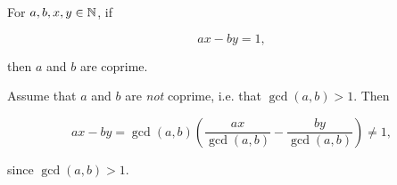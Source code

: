 \begin{vworklemmastatement}
\label{lem:cpri0:ppn0:000p}
For $a, b, x, y \in {\mathbb{N}}$, if

\begin{equation}
 ax - by = 1 ,
\end{equation}

then $a$ and $b$ are coprime.
\end{vworklemmastatement}
\begin{vworklemmaproof}
Assume that $a$ and $b$ are \emph{not} coprime,
i.e. that $\gcd(a,b) > 1$.  Then

\begin{equation}
ax-by =
\gcd(a,b) \left( { \frac{ax}{\gcd(a,b)}-\frac{by}{\gcd(a,b)}} \right) 
\neq 1 ,
\end{equation}

since $\gcd(a,b) > 1$.
\end{vworklemmaproof}

